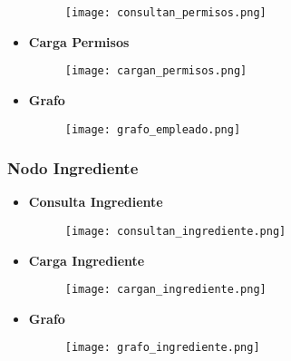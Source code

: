 \documentclass[a4paper]{article}
\begin{document}
\begin{itemize}
    \begin{figure}[H]
        \centering
        \texttt{[image: consultan\_permisos.png]}
        \label{fig:consultan_permisos}
    \end{figure}

    \item \textbf{\large{Carga Permisos}}

    \begin{figure}[H]
        \centering
        \texttt{[image: cargan\_permisos.png]}
        \label{fig:cargan_permisos}
    \end{figure}

    \item \textbf{\large{Grafo}}

    \begin{figure}[H]
        \centering
        \texttt{[image: grafo\_empleado.png]}
        \label{fig:grafo_empleado}
    \end{figure}

\end{itemize}

\subsubsection{\Large{Nodo Ingrediente}}

\begin{itemize}

    \item \textbf{\large{Consulta Ingrediente}}

    \begin{figure}[H]
        \centering
        \texttt{[image: consultan\_ingrediente.png]}
        \label{fig:consultan_ingrediente}
    \end{figure}

    \item \textbf{\large{Carga Ingrediente}}

    \begin{figure}[H]
        \centering
        \texttt{[image: cargan\_ingrediente.png]}
        \label{fig:cargan_ingrediente}
    \end{figure}

    \item \textbf{\large{Grafo}}

    \begin{figure}[H]
        \centering
        \texttt{[image: grafo\_ingrediente.png]}
        \label{fig:grafo_ingrediente}
    \end{figure}

\end{itemize}
\end{document}
